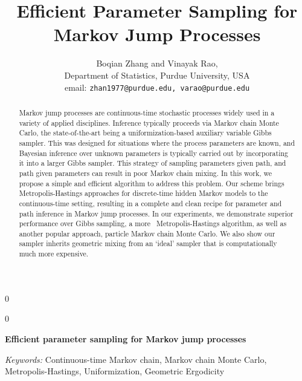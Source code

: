 \documentclass[12pt]{article}
\newcommand{\blind}{0}
\begin{document}
%

\def\spacingset#1{\renewcommand{\baselinestretch}%
{#1}\small\normalsize} \spacingset{1}



\blind
{
  \title{\bf Efficient Parameter Sampling for Markov Jump Processes}
  \author{Boqian Zhang and Vinayak Rao, \\
          Department of Statistics, Purdue University, USA \\
          email: \texttt{zhan1977@purdue.edu, varao@purdue.edu}
  }
  \maketitle
} \fi

\blind
{
  \bigskip
  \bigskip
  \bigskip
  \begin{center}
    {\LARGE\bf Efficient parameter sampling for Markov jump processes}
\end{center}
  \medskip
} \fi

\bigskip
\begin{abstract}
Markov jump processes  are continuous-time stochastic processes widely used in a variety of applied disciplines. 
Inference typically proceeds via Markov chain Monte Carlo, the state-of-the-art being a uniformization-based auxiliary variable Gibbs sampler. 
This was designed for situations where the process parameters are known, and Bayesian inference over unknown parameters is typically carried out by incorporating it into a larger Gibbs sampler.
This strategy of sampling parameters given path, and path given parameters can result in poor Markov chain mixing. 
In this work, we propose a simple and efficient algorithm to address this problem. 
Our scheme brings Metropolis-Hastings approaches for discrete-time hidden Markov models to the continuous-time setting, resulting in a complete and clean recipe for parameter and path inference in Markov jump processes. 
In our experiments, we demonstrate superior performance over Gibbs sampling, a more \naive\ Metropolis-Hastings algorithm, as well as another popular approach, particle Markov chain Monte Carlo.
We also show our sampler inherits geometric mixing from an `ideal' sampler that is computationally much more expensive.
\end{abstract}

\noindent%
{\it Keywords:}  Continuous-time Markov chain, Markov chain Monte Carlo, 
Metropolis-Hastings, Uniformization, Geometric Ergodicity 
\vfill
\end{document}
